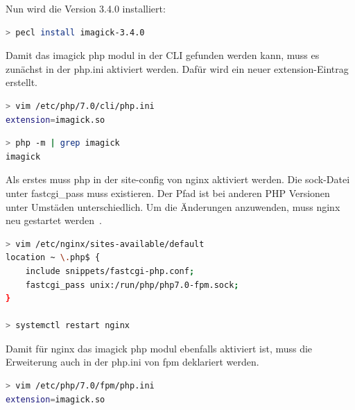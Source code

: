 Nun wird die Version 3.4.0 installiert:
\begin{lstlisting}[language=Bash, caption=PECL Install Imagick Modul,label={lst:peclinstallimagick}]
> pecl install imagick-3.4.0
\end{lstlisting}
\vspace{5mm}

Damit das imagick php modul in der CLI gefunden werden kann, muss es zunächst in der php.ini aktiviert werden.
Dafür wird ein neuer extension-Eintrag erstellt.

\begin{lstlisting}[language=Bash, caption=PHP Imagick aktivieren,label={lst:phpactivateimagick}]
> vim /etc/php/7.0/cli/php.ini
extension=imagick.so
\end{lstlisting}
\vspace{5mm}

\begin{lstlisting}[language=Bash, caption=PHP Überprüfe Imagick Modul,label={lst:phpcheckimagicksuccess}]
> php -m | grep imagick
imagick
\end{lstlisting}


Als erstes muss php in der site-config von nginx aktiviert werden. 
Die sock-Datei unter fastcgi\_pass muss existieren. 
Der Pfad ist bei anderen PHP Versionen unter Umstäden unterschiedlich. 
Um die Änderungen anzuwenden, muss nginx neu gestartet werden~\cite{InstallNginxPHP}.

\begin{lstlisting}[language=Bash, caption=NGINX Default-Config,label={lst:nginxdefaultconf}]
> vim /etc/nginx/sites-available/default
location ~ \.php$ {
    include snippets/fastcgi-php.conf;
    fastcgi_pass unix:/run/php/php7.0-fpm.sock;
}

> systemctl restart nginx
\end{lstlisting}
\vspace{5mm}

\newpage


Damit für nginx das imagick php modul ebenfalls aktiviert ist, muss die Erweiterung auch in der php.ini von fpm deklariert werden.

\begin{lstlisting}[language=Bash, caption=PHP-FPM Imagick Modul aktivieren,label={lst:phpfpmaddimagick}]
> vim /etc/php/7.0/fpm/php.ini
extension=imagick.so
\end{lstlisting}
\vspace{5mm}


